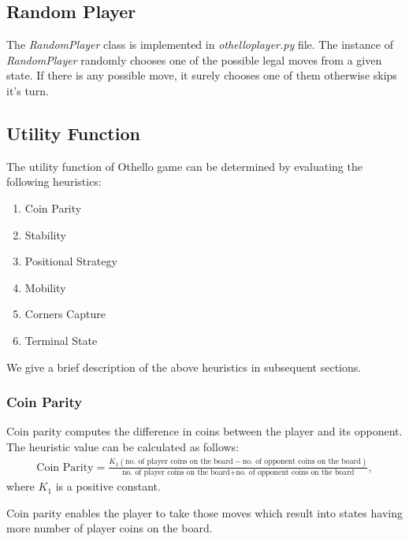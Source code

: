 \subsection*{Random Player}
The \textit{RandomPlayer} class is implemented in \textit{othelloplayer.py} file. The instance of \textit{RandomPlayer} randomly chooses one of the possible legal moves from a given state. If there is any possible move, it surely chooses one of them otherwise skips it's turn.
\subsection*{Utility Function}
The utility function of Othello game can be determined by evaluating the following heuristics:
\begin{enumerate}
	\item Coin Parity
	\item Stability
	\item Positional Strategy
	\item Mobility
	\item Corners Capture
	\item Terminal State
\end{enumerate}
We give a brief description of the above heuristics in subsequent sections.
\subsubsection*{Coin Parity}
Coin parity computes the difference in coins between the player and its opponent. The heuristic value can be calculated as follows:
\begin{align*}
	\text{Coin Parity} = \frac{K_1(\text{no. of player coins on the board}-\text{no. of opponent coins on the board})}{\text{no. of player coins on the board}+\text{no. of opponent coins on the board}},
\end{align*}
where $K_1$ is a positive constant.

Coin parity enables the player to take those moves which result into states having more number of player coins on the board.
